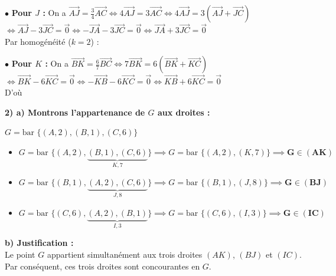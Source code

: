 \documentclass{article}
\begin{document}
\vspace{1em}
\noindent $\bullet$ \textbf{Pour $J$ :} On a $\overrightarrow{AJ} = \frac{3}{4} \overrightarrow{AC} \iff 4\overrightarrow{AJ} = 3\overrightarrow{AC} \iff 4\overrightarrow{AJ} = 3(\overrightarrow{AJ} + \overrightarrow{JC})$ \\
$\iff \overrightarrow{AJ} - 3\overrightarrow{JC} = \vec{0} \iff -\overrightarrow{JA} - 3\overrightarrow{JC} = \vec{0} \iff \overrightarrow{JA} + 3\overrightarrow{JC} = \vec{0}$ \\
Par homogénéité ($k=2$) : 

\vspace{1em}
\noindent $\bullet$ \textbf{Pour $K$ :} On a $\overrightarrow{BK} = \frac{6}{7} \overrightarrow{BC} \iff 7\overrightarrow{BK} = 6(\overrightarrow{BK} + \overrightarrow{KC})$ \\
$\iff \overrightarrow{BK} - 6\overrightarrow{KC} = \vec{0} \iff -\overrightarrow{KB} - 6\overrightarrow{KC} = \vec{0} \iff \overrightarrow{KB} + 6\overrightarrow{KC} = \vec{0}$ \\
D'où 

\vspace{2em}

\noindent \textbf{2) a) Montrons l'appartenance de $G$ aux droites :}

\vspace{0.5em}
\noindent $G = \text{bar } \{(A, 2), (B, 1), (C, 6)\}$
\begin{itemize}
    \item $G = \text{bar } \{(A, 2), \underbrace{(B, 1), (C, 6)}_{K, 7}\} \implies G = \text{bar } \{(A, 2), (K, 7)\} \implies \mathbf{G \in (AK)}$
    \item $G = \text{bar } \{(B, 1), \underbrace{(A, 2), (C, 6)}_{J, 8}\} \implies G = \text{bar } \{(B, 1), (J, 8)\} \implies \mathbf{G \in (BJ)}$
    \item $G = \text{bar } \{(C, 6), \underbrace{(A, 2), (B, 1)}_{I, 3}\} \implies G = \text{bar } \{(C, 6), (I, 3)\} \implies \mathbf{G \in (IC)}$
\end{itemize}

\vspace{1em}
\noindent \textbf{b) Justification :} \\
Le point $G$ appartient simultanément aux trois droites $(AK)$, $(BJ)$ et $(IC)$. Par conséquent, ces trois droites sont concourantes en $G$.
\end{document}
